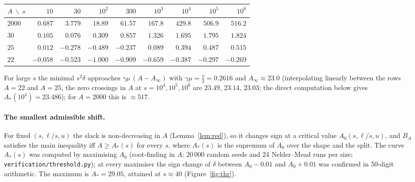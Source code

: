 \documentclass[11pt]{article}
\theoremstyle{definition}
\numberwithin{equation}{section}
\begin{document}
\begin{center}
\begin{tabular}{lrrrrrrrr}
\toprule
$A\ \backslash\ s$ & $10$ & $30$ & $10^2$ & $300$ & $10^3$ & $10^4$ & $10^5$ & $10^6$\\
\midrule
$2000$ & $0.687$ & $3.779$ & $18.89$ & $61.57$ & $167.8$ & $429.8$ & $506.9$ & $516.2$\\
$30$ & $0.105$ & $0.076$ & $0.309$ & $0.857$ & $1.326$ & $1.695$ & $1.795$ & $1.824$\\
$25$ & $0.012$ & $-0.278$ & $-0.489$ & $-0.237$ & $0.089$ & $0.394$ & $0.487$ & $0.515$\\
$22$ & $-0.058$ & $-0.523$ & $-1.000$ & $-0.909$ & $-0.659$ & $-0.387$ & $-0.297$ & $-0.269$\\
\bottomrule
\end{tabular}
\end{center}
For large $s$ the minimal $s^2\delta$ approaches $\gamma\mu\,(A-A_\infty)$ with $\gamma\mu=\frac\nu2=0.2616$ and $A_\infty\approx23.0$
(interpolating linearly between the rows $A=22$ and $A=25$, the zero crossings in $A$ at $s=10^4,10^5,10^6$ are $23.49$, $23.14$,
$23.03$; the direct computation below gives $A_*(10^4)=23.486$); for $A=2000$ this is $\approx517$.

\paragraph{The smallest admissible shift.} For fixed $(s,\ell/s,u)$ the slack is non-decreasing in $A$ (Lemma~\ref{lem:red}), so
it changes sign at a critical value $A_0(s,\ell/s,u)$, and $B_A$ satisfies the main inequality iff $A\ge A_*(s)$ for every $s$,
where $A_*(s)$ is the supremum of $A_0$ over the shape and the split. The curve $A_*(s)$ was computed by maximising $A_0$ (root-finding in $A$; $20\,000$ random seeds and 24 Nelder--Mead
runs per size; \texttt{verification/threshold.py}); at every maximiser the sign change of $\delta$ between $A_0-0.01$ and
$A_0+0.01$ was confirmed in 50-digit arithmetic. The maximum is $A_*=29.05$, attained at $s\approx40$ (Figure~\ref{fig:thr}).
\end{document}
